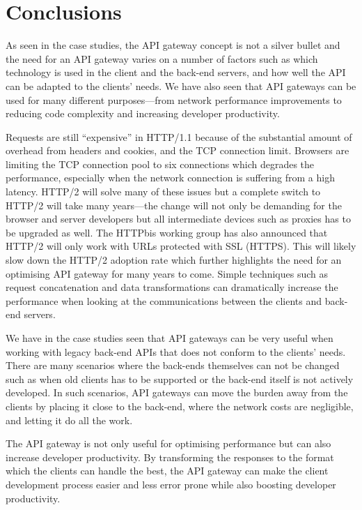\documentclass{cslthse-msc}
\begin{document}
\chapter{Conclusions}
As seen in the case studies, the API gateway concept is not a silver bullet and the need for an API gateway varies on a number of factors such as which technology is used in the client and the back-end servers, and how well the API can be adapted to the clients' needs. We have also seen that API gateways can be used for many different purposes---from network performance improvements to reducing code complexity and increasing developer productivity.

Requests are still \enquote{expensive} in HTTP/1.1 because of the substantial amount of overhead from headers and cookies, and the TCP connection limit. Browsers are limiting the TCP connection pool to six connections which degrades the performance, especially when the network connection is suffering from a high latency. HTTP/2 will solve many of these issues but a complete switch to HTTP/2 will take many years---the change will not only be demanding for the browser and server developers but all intermediate devices such as proxies has to be upgraded as well. The HTTPbis working group has also announced that HTTP/2 will only work with URLs protected with SSL (HTTPS)\cite{http2_ssl}. This will likely slow down the HTTP/2 adoption rate which further highlights the need for an optimising API gateway for many years to come. Simple techniques such as request concatenation and data transformations can dramatically increase the performance when looking at the communications between the clients and back-end servers.

We have in the case studies seen that API gateways can be very useful when working with legacy back-end APIs that does not conform to the clients' needs. There are many scenarios where the back-ends themselves can not be changed such as when old clients has to be supported or the back-end itself is not actively developed. In such scenarios, API gateways can move the burden away from the clients by placing it close to the back-end, where the network costs are negligible, and letting it do all the work. 

The API gateway is not only useful for optimising performance but can also increase developer productivity. By transforming the responses to the format which the clients can handle the best, the API gateway can make the client development process easier and less error prone while also boosting developer productivity.
\end{document}
